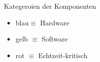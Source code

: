 \documentclass[xcolor=dvipsnames]{beamer}
\begin{document}
\begin{frame}
\begin{columns}
\begin{column}{0.70\textwidth}
\begin{minipage}{1.0\textwidth}
{\begin{tikzpicture}
						
					\end{tikzpicture}
				}
			\end{minipage}
		\end{column}
		\begin{column}{0.30\textwidth}
			\begin{block}{Kategeroien der Komponenten}
				\begin{itemize}
					\item blau$\equiv$ Hardware
					\item gelb $\equiv$ Software
					\item rot	$\equiv$ Echtzeit-kritisch
				\end{itemize}
				
				
			\end{block}
		\end{column}
	\end{columns}
\end{frame}
	
	
	
	
	
	
\end{document}
